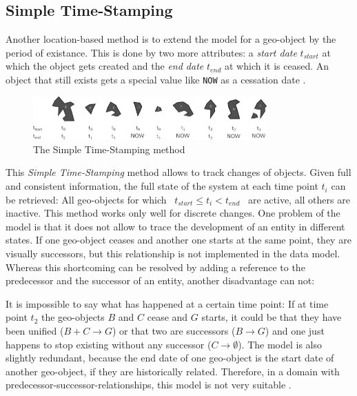 
\subsection{Simple Time-Stamping} %
\label{sub:simple_time_stamping}

Another location-based method is to extend the model for a geo-object by the period of existance. This is done by two more attributes: a \emph{start date} $t_{start}$ at which the object gets created and the \emph{end date} $t_{end}$ at which it is ceased. An object that still exists gets a special value like \texttt{NOW} as a cessation date
\cite{hunter90timestamping}.

\begin{figure}[ht]
  \centering
  \includegraphics[width=0.8\textwidth]{graphics/basics/stdm/simple_time_stamping}
  \caption{The Simple Time-Stamping method}
  \label{fig:simple_time_stamping}
\end{figure}

This \emph{Simple Time-Stamping} method allows to track changes of objects. Given full and consistent information, the full state of the system at each time point $t_i$ can be retrieved: All geo-objects for which ~$t_{start} \leq t_i < t_{end}$~ are active, all others are inactive. This method works only well for discrete changes. One problem of the model is that it does not allow to trace the development of an entity in different states. If one geo-object ceases and another one starts at the same point, they are visually successors, but this relationship is not implemented in the data model. Whereas this shortcoming can be resolved by adding a reference to the predecessor and the successor of an entity, another disadvantage can not:

It is impossible to say what has happened at a certain time point: If at time point $t_2$ the geo-objects $B$ and $C$ cease and $G$ starts, it could be that they have been unified ($B+C \to G$) or that two are successors ($B \to G$) and one just happens to stop existing without any successor ($C \to \emptyset$). The model is also slightly redundant, because the end date of one geo-object is the start date of another geo-object, if they are historically related. Therefore, in a domain with predecessor-successor-relationships, this model is not very suitable
\cite[p. 46-47]{solana2014spatio}.

